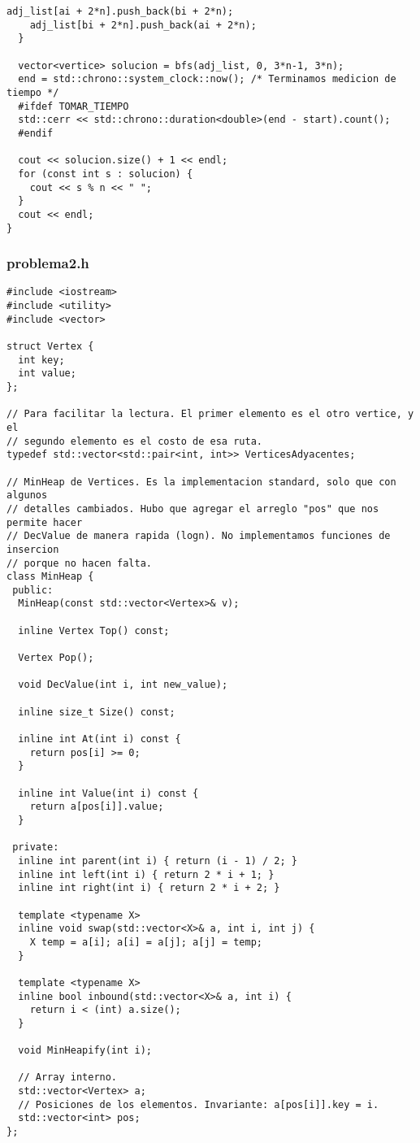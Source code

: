 \begin{lstlisting}[frame=single]
    adj_list[ai + 2*n].push_back(bi + 2*n);
    adj_list[bi + 2*n].push_back(ai + 2*n);
  }

  vector<vertice> solucion = bfs(adj_list, 0, 3*n-1, 3*n);
  end = std::chrono::system_clock::now(); /* Terminamos medicion de tiempo */
  #ifdef TOMAR_TIEMPO
  std::cerr << std::chrono::duration<double>(end - start).count();
  #endif
  
  cout << solucion.size() + 1 << endl;
  for (const int s : solucion) {
    cout << s % n << " ";
  }
  cout << endl;
}
\end{lstlisting}




\subsubsection{problema2.h}
\begin{lstlisting}[frame=single]
#include <iostream>
#include <utility>
#include <vector>

struct Vertex {
  int key;
  int value;
};

// Para facilitar la lectura. El primer elemento es el otro vertice, y el
// segundo elemento es el costo de esa ruta.
typedef std::vector<std::pair<int, int>> VerticesAdyacentes;

// MinHeap de Vertices. Es la implementacion standard, solo que con algunos 
// detalles cambiados. Hubo que agregar el arreglo "pos" que nos permite hacer
// DecValue de manera rapida (logn). No implementamos funciones de insercion
// porque no hacen falta.
class MinHeap {
 public:
  MinHeap(const std::vector<Vertex>& v);

  inline Vertex Top() const;

  Vertex Pop();

  void DecValue(int i, int new_value);

  inline size_t Size() const;

  inline int At(int i) const {
    return pos[i] >= 0;
  }

  inline int Value(int i) const {
    return a[pos[i]].value;
  }

 private:
  inline int parent(int i) { return (i - 1) / 2; }
  inline int left(int i) { return 2 * i + 1; }
  inline int right(int i) { return 2 * i + 2; }

  template <typename X>
  inline void swap(std::vector<X>& a, int i, int j) {
    X temp = a[i]; a[i] = a[j]; a[j] = temp;
  }

  template <typename X>
  inline bool inbound(std::vector<X>& a, int i) {
    return i < (int) a.size();
  }
  
  void MinHeapify(int i);

  // Array interno.
  std::vector<Vertex> a;
  // Posiciones de los elementos. Invariante: a[pos[i]].key = i.
  std::vector<int> pos;
};
\end{lstlisting}




